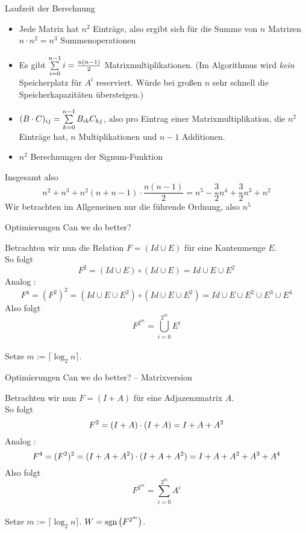 \begin{frame}{Laufzeit der Berechnung}
	\begin{itemize}[<+->]
		\item Jede Matrix hat $n^2$ Einträge, also ergibt sich für die Summe von $n$ Matrizen $n\cdot n^2=n^3$ Summenoperationen 
		\item  Es gibt $\sum\limits_{i=0}^{n-1} i = \frac{n(n-1)}{2} $ Matrixmultiplikationen. (Im Algorithmus wird \emph{kein} Speicherplatz für $A^i$ reserviert. Würde bei großen $n$ sehr schnell die Speicherkapazitäten übersteigen.) 
		\item $(B\cdot C)_{ij} = \sum\limits_{k=0}^{n-1} B_{ik} C_{kj}$, also pro Eintrag einer Matrixmultiplikation, die $n^2$ Einträge hat, $n$ Multiplikationen und $n-1$ Additionen. 
		\item $n^2$ Berechnungen der Signum-Funktion 
	\end{itemize}
	\pause
	Insgesamt also $$ n^2 + n^3 + n^2(n+n-1)\cdot \frac{n(n-1)}{2} = n^5 - \frac{3}{2} n^4 + \frac{3}{2} n^3 + n^2 $$
	Wir betrachten im Allgemeinen nur die führende Ordnung, also $n^5$
\end{frame}

\begin{frame}{Optimierungen}
	Can we do better? \pause
	\bigskip
	
	Betrachten wir nun die Relation $ F = (Id \cup E) $ für eine Kantenmenge $E$. \\  \pause 
	So folgt $$ F^2 = (Id \cup E) \circ (Id \cup E) = Id \cup E \cup E^2 $$ \pause
	Analog : $$ F^4 = (F^2)^2 = (Id\cup E \cup E^2) \circ (Id\cup E\cup E^2) = Id \cup E \cup E^2 \cup E^3 \cup E^4 $$ \pause 
	Also folgt $$ F^{2^m} = \bigcup\limits_{i=0}^{2^m} E^i$$ \\
	Setze $m := \lceil \log_2 n \rceil $.
\end{frame}

\begin{frame}{Optimierungen}
	Can we do better? – Matrixversion \pause
	\bigskip
	
	Betrachten wir nun $ F = (I + A) $ für eine Adjazenzmatrix $A$. \\  \pause 
	So folgt $$ F^2 = (I + A) \cdot (I + A) = I + A + A^2 $$ \pause
	Analog : $$ F^4 = (F^2)^2 = (I + A + A^2) \cdot (I + A + A^2) = I + A + A^2 + A^3 + A^4 $$ \pause 
	Also folgt $$ F^{2^m} = \sum\limits_{i=0}^{2^m} A^i$$ \\
	Setze $m := \lceil \log_2 n \rceil $. \pause \impl $W = \mathop{\text{sgn}}\big(F^{2^m}\big)$.
\end{frame}


